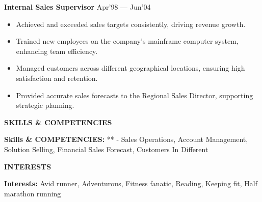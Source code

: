 \documentclass[11pt]{article}
\begin{document}
\textbf{Internal Sales Supervisor} \hfill Apr’98 — Jun’04
\begin{itemize}[noitemsep, topsep=0pt, partopsep=0pt, parsep=0pt]
    \item Achieved and exceeded sales targets consistently, driving revenue growth.
    \item Trained new employees on the company’s mainframe computer system, enhancing team efficiency.
    \item Managed customers across different geographical locations, ensuring high satisfaction and retention.
    \item Provided accurate sales forecasts to the Regional Sales Director, supporting strategic planning.
\end{itemize}

    \vspace{12pt}
    \begin{center}
        \textbf{\large SKILLS \& COMPETENCIES}
    \end{center}
    \textbf{Skills \& COMPETENCIES:} **
- Sales Operations, Account Management, Solution Selling, Financial Sales Forecast, Customers In Different

    \vspace{12pt}
    \begin{center}
        \textbf{\large INTERESTS}
    \end{center}
    \textbf{Interests:} Avid runner, Adventurous, Fitness fanatic, Reading, Keeping fit, Half marathon running
    
\end{document}
